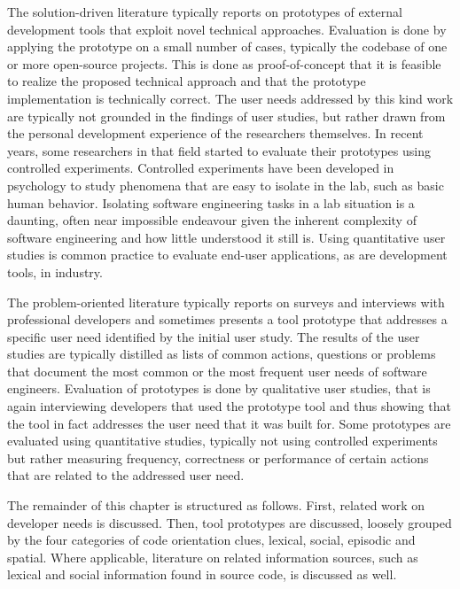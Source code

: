 The solution-driven literature typically reports on prototypes of external development tools that exploit novel technical approaches. Evaluation is done by applying the prototype on a small number of cases, typically the codebase of one or more open-source projects. This is done as proof-of-concept that it is feasible to realize the proposed technical approach and that the prototype implementation is technically correct. The user needs addressed by this kind work are typically not grounded in the findings of user studies, but rather drawn from the personal development experience of the researchers themselves. In recent years, some researchers in that field started to evaluate their prototypes using controlled experiments. 
Controlled experiments have been developed in psychology to study phenomena that are easy to isolate in the lab, such as basic human behavior. Isolating software engineering tasks in a lab situation is a daunting, often near impossible endeavour given the inherent complexity of software engineering and how little understood it still is. Using quantitative user studies is common practice to evaluate end-user applications, as are development tools, in industry.

The problem-oriented literature typically reports on surveys and interviews with professional developers and sometimes presents a tool prototype that addresses a specific user need identified by the initial user study. The results of the user studies are typically distilled as lists of common actions, questions or problems that document the most common or the most frequent user needs of software engineers. Evaluation of prototypes is done by qualitative user studies, that is again interviewing developers that used the prototype tool and thus showing that the tool in fact addresses the user need that it was built for. Some prototypes are evaluated using quantitative studies, typically not using controlled experiments but rather measuring frequency, correctness or performance of certain actions that are related to the addressed user need.

\asteriskasteriskasterisk

The remainder of this chapter is structured as follows. First, related work on developer needs is discussed. Then, tool prototypes are discussed, loosely grouped by the four categories of code orientation clues, \ie lexical, social, episodic and spatial. Where applicable, literature on related information sources, such as \eg lexical and social information found in source code, is discussed as well.

